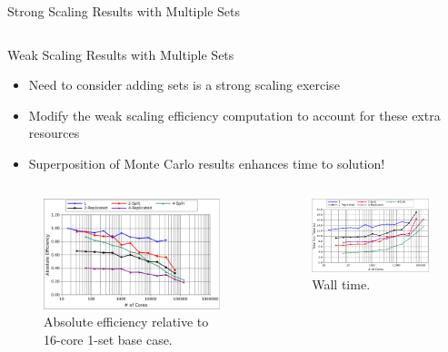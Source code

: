 \documentclass{beamer}
\begin{document}
\begin{frame}{Strong Scaling Results with Multiple Sets}
\begin{columns}
\begin{column}{0.5\textwidth}
    \end{column}
  \end{columns}

\end{frame}

\begin{frame}{Weak Scaling Results with Multiple Sets}

  \begin{itemize}
  \item Need to consider adding sets is a strong scaling exercise
  \item Modify the weak scaling efficiency computation to account for
    these extra resources
  \item Superposition of Monte Carlo results enhances time to solution!
  \end{itemize}

  \begin{columns}
    \begin{column}{0.5\textwidth}

      \begin{figure}[htpb!]
        \begin{center}
          \includegraphics[width=2.4in]{titan_weak_ms_eff.pdf}
        \end{center}
        \caption{Absolute efficiency relative to 16-core 1-set base
          case.}
      \end{figure}

    \end{column}

    \begin{column}{0.5\textwidth}

      \begin{figure}[htpb!]
        \begin{center}
          \includegraphics[width=2.4in]{titan_weak_ms_time.pdf}
        \end{center}
        \caption{Wall time.}
      \end{figure}

    \end{column}
  \end{columns}

\end{frame}
\end{document}
